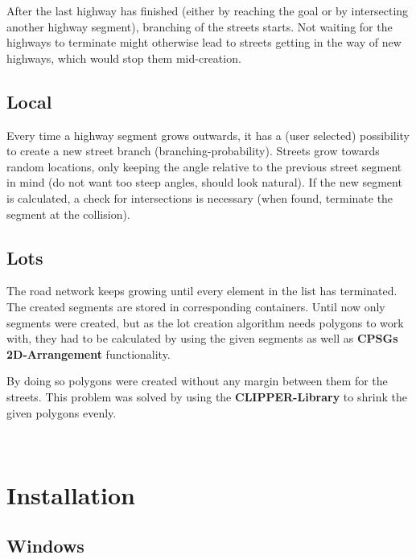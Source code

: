After the last highway has finished (either by reaching the goal or by intersecting another highway segment), branching of the streets starts. Not waiting for the highways to terminate might otherwise lead to streets getting in the way of new highways, which would stop them mid-\/creation.\hypertarget{index_Local}{}\subsection{Local}\label{index_Local}
Every time a highway segment grows outwards, it has a (user selected) possibility to create a new street branch (branching-\/probability). Streets grow towards random locations, only keeping the angle relative to the previous street segment in mind (do not want too steep angles, should look natural). If the new segment is calculated, a check for intersections is necessary (when found, terminate the segment at the collision).\hypertarget{index_Lots}{}\subsection{Lots}\label{index_Lots}
The road network keeps growing until every element in the list has terminated. The created segments are stored in corresponding containers. Until now only segments were created, but as the lot creation algorithm needs polygons to work with, they had to be calculated by using the given segments as well as {\bfseries C\+P\+S\+Gs} {\bfseries 2\+D-\/\+Arrangement} functionality.



By doing so polygons were created without any margin between them for the streets. This problem was solved by using the {\bfseries C\+L\+I\+P\+P\+E\+R-\/\+Library} to shrink the given polygons evenly.

~\newline
 \hypertarget{index_install_sec}{}\section{Installation}\label{index_install_sec}
\hypertarget{index_windows}{}\subsection{Windows}\label{index_windows}

